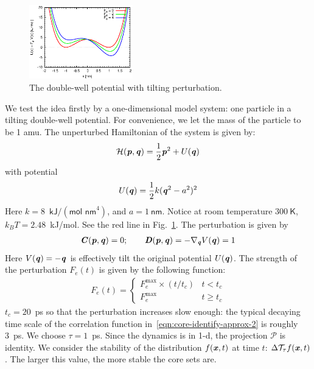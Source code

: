 \documentclass[aip,jcp,a4paper,reprint,onecolumn]{revtex4-1}
\newcommand{\vect}[1]{\textbf{\textit{#1}}}
\newcommand{\mh}{\mathcal H}
\newcommand{\mt}{\mathcal T}
\begin{document}
\begin{figure}
  \centering
  \includegraphics[width=0.4\textwidth]{figs/fig-tilt-pot.eps}
  \caption{The double-well potential with tilting perturbation.}
  \label{fig:tmp1}
\end{figure}

We test the idea firstly by a one-dimensional model system: one particle in a
tilting double-well potential. For convenience, we let the mass of the
particle to be 1 \textsf{amu}. The unperturbed
Hamiltonian of the system is given by:
\begin{align}
  \mh (\vect p, \vect q) = \frac 12 \vect p^2 + U(\vect q) 
\end{align}
with potential
\begin{align}
  U(\vect q) = \frac12 k (\vect q^2 - a^2)^2
\end{align}
Here $k = 8$~$\textsf{kJ} / (\textsf{mol nm}^4)$, and $ a = 1\ \textsf{nm}$.
Notice at room temperature $300\ \textsf{K}$, $k_BT = 2.48$~\textsf{kJ/mol}.
See the red line in Fig.~\ref{fig:tmp1}.
The perturbation is given by
\begin{align}
  \vect C(\vect p, \vect q) = 0; \qquad
  \vect D(\vect p, \vect q) = -\nabla_{\vect q} V(\vect q) = 1
\end{align}
Here $V(\vect q) = -\vect q$ is  effectively tilt the original
potential $U(\vect q)$. The strength of the perturbation $F_e(t)$ is given
by the following function:
\begin{align}
  F_e(t) = 
  \begin{cases}
    F_e^{\textrm{max}}\times (t / t_c) & t < t_c \\
    F_e^{\textrm{max}} & t \geq t_c
  \end{cases}
\end{align}
$t_c = 20$~\textsf{ps} so that the perturbation increases slow
enough: the typical decaying time scale of the correlation function
in~\eqref{eqn:core-identify-approx-2} is roughly 3~\textsf{ps}.
We choose $\tau = 1$~\textsf{ps}.
Since the dynamics is in
1-d, the projection $\mathcal P$ is identity.  We consider the stability of the
distribution $f(\vect x, t)$ at time $t$: $\Delta\mt_\tau f(\vect x, t)$.
The larger
this value, the more stable the core sets are.
\end{document}
